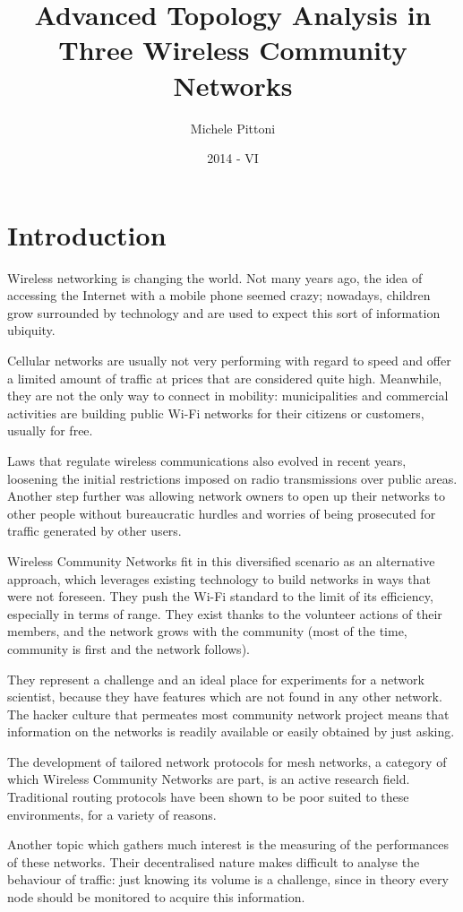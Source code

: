 \documentclass[oneside,openany]{memoir}
\title{Advanced Topology Analysis in Three Wireless Community Networks}
\author{Michele Pittoni}
\date{2014 - VI}
\begin{document}
\tableofcontents

\chapter*{Introduction}\label{introduction}

Wireless networking is changing the world. Not many years ago, the idea of
accessing the Internet with a mobile phone seemed crazy; nowadays, children
grow surrounded by technology and are used to expect this sort of information
ubiquity.

Cellular networks are usually not very performing with regard to speed and offer
a limited amount of traffic at prices that are considered quite high.
Meanwhile, they are not the only way to connect in mobility: municipalities
and commercial activities are building public Wi-Fi networks for their
citizens or customers, usually for free.

Laws that regulate wireless communications also evolved in recent years,
loosening the initial restrictions imposed on radio transmissions over
public areas.
Another step further was allowing network owners to open up their
networks to other people without bureaucratic hurdles and worries of being
prosecuted for traffic generated by other users.

Wireless Community Networks fit in this diversified scenario as an alternative
approach, which leverages existing technology to build networks in ways that 
were not foreseen.
They push the Wi-Fi standard to the limit of its efficiency, especially
in terms of range. They exist thanks to the volunteer actions of their members,
and the network grows with the community (most of the time, community is
first and the network follows).

They represent a challenge and an ideal place for experiments for a network
scientist, because they have features which are not found in any other network.
The hacker culture that permeates most community network project means that
information on the networks is readily available or easily obtained by just
asking.

The development of tailored network protocols for mesh networks, a category
of which Wireless Community Networks are part, is an active research field.
Traditional routing protocols have been shown to be poor suited to these
environments, for a variety of reasons.

Another topic which gathers much interest is the measuring of the performances
of these networks. Their decentralised nature makes difficult to analyse
the behaviour of traffic: just knowing its volume is a challenge, since in
theory every node should be monitored to acquire this information.
\end{document}
